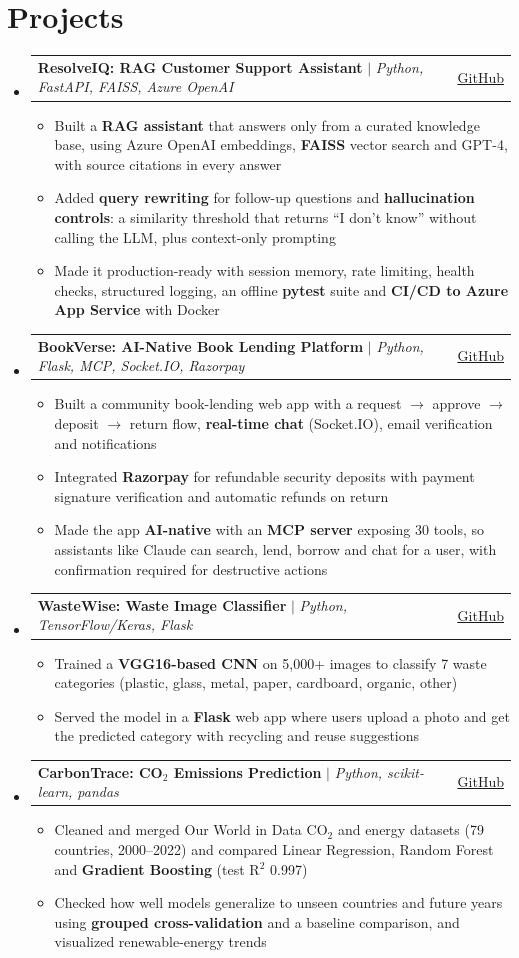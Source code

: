 \documentclass[a4paper,11pt]{article}
\makeatletter
\newcommand{\resumeItem}[1]{
  \item\small{#1}
}
\newcommand{\resumeItemListStart}{\begin{itemize}[leftmargin=0.18in, rightmargin=0.11in]}
\newcommand{\resumeItemListEnd}{\end{itemize}\vspace{3pt}}
\newcommand{\resumeProjectHeading}[3]{
  \item\small{
    \begin{tabular*}{0.97\textwidth}[t]{l@{\extracolsep{\fill}}r}
      \textbf{#1} $|$ \textit{#2} & #3
    \end{tabular*}
  }
}
\newcommand{\resumeHeadingListStart}{
  \begin{itemize}[leftmargin=0.1in, label={}]
}
\newcommand{\resumeHeadingListEnd}{\end{itemize}}
\makeatother
\begin{document}
\section{Projects}
  \resumeHeadingListStart{}
    \resumeProjectHeading{ResolveIQ: RAG Customer Support Assistant}{Python, FastAPI, FAISS, Azure OpenAI}{\href{https://github.com/PadmaI1/resolve-iq}{\uline{GitHub}}}
      \resumeItemListStart{}
        \resumeItem{Built a \textbf{RAG assistant} that answers only from a curated knowledge base, using Azure OpenAI embeddings, \textbf{FAISS} vector search and GPT-4, with source citations in every answer}
        \resumeItem{Added \textbf{query rewriting} for follow-up questions and \textbf{hallucination controls}: a similarity threshold that returns ``I don't know'' without calling the LLM, plus context-only prompting}
        \resumeItem{Made it production-ready with session memory, rate limiting, health checks, structured logging, an offline \textbf{pytest} suite and \textbf{CI/CD to Azure App Service} with Docker}
      \resumeItemListEnd{}

    \resumeProjectHeading{BookVerse: AI-Native Book Lending Platform}{Python, Flask, MCP, Socket.IO, Razorpay}{\href{https://github.com/PadmaI1/BookVerse}{\uline{GitHub}}}
      \resumeItemListStart{}
        \resumeItem{Built a community book-lending web app with a request $\rightarrow$ approve $\rightarrow$ deposit $\rightarrow$ return flow, \textbf{real-time chat} (Socket.IO), email verification and notifications}
        \resumeItem{Integrated \textbf{Razorpay} for refundable security deposits with payment signature verification and automatic refunds on return}
        \resumeItem{Made the app \textbf{AI-native} with an \textbf{MCP server} exposing 30 tools, so assistants like Claude can search, lend, borrow and chat for a user, with confirmation required for destructive actions}
      \resumeItemListEnd{}

    \resumeProjectHeading{WasteWise: Waste Image Classifier}{Python, TensorFlow/Keras, Flask}{\href{https://github.com/PadmaI1/waste-wise}{\uline{GitHub}}}
      \resumeItemListStart{}
        \resumeItem{Trained a \textbf{VGG16-based CNN} on 5,000+ images to classify 7 waste categories (plastic, glass, metal, paper, cardboard, organic, other)}
        \resumeItem{Served the model in a \textbf{Flask} web app where users upload a photo and get the predicted category with recycling and reuse suggestions}
      \resumeItemListEnd{}

    \resumeProjectHeading{CarbonTrace: CO$_2$ Emissions Prediction}{Python, scikit-learn, pandas}{\href{https://github.com/PadmaI1/carbon-trace}{\uline{GitHub}}}
      \resumeItemListStart{}
        \resumeItem{Cleaned and merged Our World in Data CO$_2$ and energy datasets (79 countries, 2000--2022) and compared Linear Regression, Random Forest and \textbf{Gradient Boosting} (test R$^2$ 0.997)}
        \resumeItem{Checked how well models generalize to unseen countries and future years using \textbf{grouped cross-validation} and a baseline comparison, and visualized renewable-energy trends}
      \resumeItemListEnd{}
  \resumeHeadingListEnd{}
\end{document}

